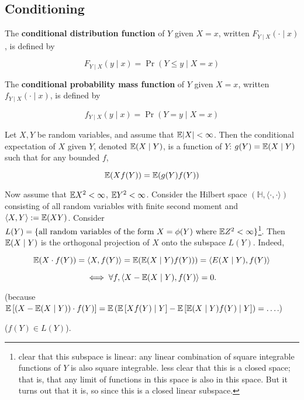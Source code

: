 \subsection{Conditioning}

\begin{definition}The \textbf{conditional distribution function} of \(Y\) given \(X = x\), written \(F_{Y\mid X}( \cdot \mid x)\), is defined by

\[
F_{Y\mid X}( y \mid x) = \Pr(Y \leq y \mid X = x)
\]
\end{definition}

\begin{definition}The \textbf{conditional probability mass function} of \(Y\) given \(X = x\), written \(f_{Y\mid X}( \cdot \mid x)\), is defined by

\[
f_{Y\mid X}( y \mid x) = \Pr(Y = y \mid X = x)
\]
\end{definition}

\begin{definition} Let \(X, Y\) be random variables, and assume that \(\mathbb{E} |X| < \infty\). Then the conditional expectation of \(X\) given \(Y\), denoted \(\mathbb{E}(X \mid Y)\), is a function of \(Y\): \(g(Y) = \mathbb{E}(X \mid Y)\) such that for any bounded \(f\),

\[
\mathbb{E}(X f(Y)) = \mathbb{E}(g(Y) f(Y)) 
\]

Now assume that \(\mathbb{E} X^2 < \infty\), \(\mathbb{E} Y^2 < \infty\). Consider the Hilbert space \(( \mathbb{H}, \langle \cdot, \cdot \rangle)\) consisting of all random variables with finite second moment and \(\langle X, Y \rangle := \mathbb{E}(XY)\). Consider \(L(Y) = \{\text{all random variables of the form } X = \phi(Y) \text{ where } \mathbb{E} Z^2 < \infty\}\)\footnote{clear that this subspace is linear: any linear combination of square integrable functions of \(Y\) is also square integrable. less clear that this is a closed space; that is, that any limit of functions in this space is also in this space. But it turns out that it is, so since this is a closed linear subspace.}. Then \(\mathbb{E}(X \mid Y)\) is the orthogonal projection of \(X\) onto the subspace \(L(Y)\). Indeed,

\[
\mathbb{E}(X \cdot f(Y)) = \langle X, f(Y) \rangle = \mathbb{E}( \mathbb{E}( X \mid Y) f(Y) )) = \langle E(X \mid Y) , f(Y) \rangle
\]

\[
\iff \forall f, \langle X - \mathbb{E}(X \mid Y) , f(Y) \rangle = 0.
\]

(because \( \mathbb{E}\left[(X - \mathbb{E}(X \mid Y)) \cdot f(Y) \right] = \mathbb{E} \left( \mathbb{E}\left[Xf(Y)  \mid Y  \right]- \mathbb{E}\left[ \mathbb{E}(X \mid Y) f(Y) \mid Y \right]\right)  = \ldots  \).)

(\(f(Y) \in L(Y)\)).

\end{definition}


